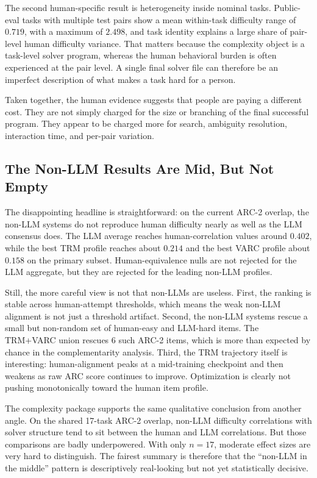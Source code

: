 \documentclass[11pt,letterpaper]{article}
\begin{document}
The second human-specific result is heterogeneity inside nominal tasks. Public-eval tasks with multiple test pairs show a mean within-task difficulty range of $0.719$, with a maximum of $2.498$, and task identity explains a large share of pair-level human difficulty variance. That matters because the complexity object is a task-level solver program, whereas the human behavioral burden is often experienced at the pair level. A single final solver file can therefore be an imperfect description of what makes a task hard for a person.

Taken together, the human evidence suggests that people are paying a different cost. They are not simply charged for the size or branching of the final successful program. They appear to be charged more for search, ambiguity resolution, interaction time, and per-pair variation.

\subsection{The Non-LLM Results Are Mid, But Not Empty}

The disappointing headline is straightforward: on the current ARC-2 overlap, the non-LLM systems do not reproduce human difficulty nearly as well as the LLM consensus does. The LLM average reaches human-correlation values around $0.402$, while the best TRM profile reaches about $0.214$ and the best VARC profile about $0.158$ on the primary subset. Human-equivalence nulls are not rejected for the LLM aggregate, but they are rejected for the leading non-LLM profiles.

Still, the more careful view is not that non-LLMs are useless. First, the ranking is stable across human-attempt thresholds, which means the weak non-LLM alignment is not just a threshold artifact. Second, the non-LLM systems rescue a small but non-random set of human-easy and LLM-hard items. The TRM+VARC union rescues 6 such ARC-2 items, which is more than expected by chance in the complementarity analysis. Third, the TRM trajectory itself is interesting: human-alignment peaks at a mid-training checkpoint and then weakens as raw ARC score continues to improve. Optimization is clearly not pushing monotonically toward the human item profile.

The complexity package supports the same qualitative conclusion from another angle. On the shared 17-task ARC-2 overlap, non-LLM difficulty correlations with solver structure tend to sit between the human and LLM correlations. But those comparisons are badly underpowered. With only $n = 17$, moderate effect sizes are very hard to distinguish. The fairest summary is therefore that the ``non-LLM in the middle'' pattern is descriptively real-looking but not yet statistically decisive.
\end{document}
